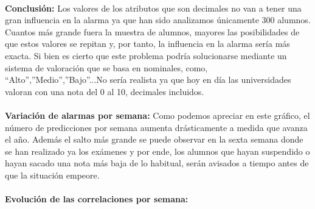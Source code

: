 \paragraph{}
\textbf{Conclusión:} Los valores de los atributos que son decimales no van a tener una gran influencia en la alarma ya que han sido analizamos únicamente 300 alumnos. Cuantos más grande fuera la muestra de alumnos, mayores las posibilidades de que estos valores se repitan y, por tanto, la influencia en la alarma sería más exacta. Si bien es cierto que este problema podría solucionarse mediante un sistema de valoración que se basa en nominales, como, “Alto”,”Medio”,”Bajo”...No sería realista ya que hoy en día las universidades valoran con una nota del 0 al 10, decimales incluidos.

\paragraph{}
\textbf{Variación de alarmas por semana:}
Como podemos apreciar en este gráfico, el número de
predicciones por semana aumenta drásticamente a medida que avanza el
año. Además el salto más grande se puede observar en la sexta semana
donde se han realizado ya los exámenes y por ende, los alumnos que
hayan suspendido o hayan sacado una nota más baja de lo habitual,
serán avisados a tiempo antes de que la situación empeore.

\paragraph{}
\textbf{Evolución de las correlaciones por semana:}\\
\\
\paragraph{}
\paragraph{}
\paragraph{}
  
